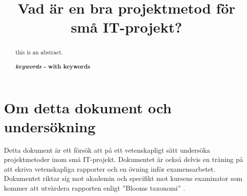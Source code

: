 \documentclass[conference,a4paper]{IEEEtran}
\begin{document}
%
\title{Vad är en bra projektmetod för små IT-projekt?}


\author
    {
    }

\maketitle

\begin{abstract}
  this is an abstract.

  \textbf{\textit{keywords} - with keywords}
\end{abstract}

\IEEEpeerreviewmaketitle

\section{Om detta dokument och undersökning}
Detta dokument är ett försök att på ett vetenskapligt sätt undersöka projektmetoder inom små IT-projekt. Dokumentet är också delvis en träning på att skriva vetenskapliga rapporter och en övning inför examensarbetet. Dokumentet riktar sig mot akademin och specifikt mot kursens examinator som kommer att utvärdera rapporten enligt ''Blooms taxonomi'' \cite{krathwohl10}.
\end{document}
